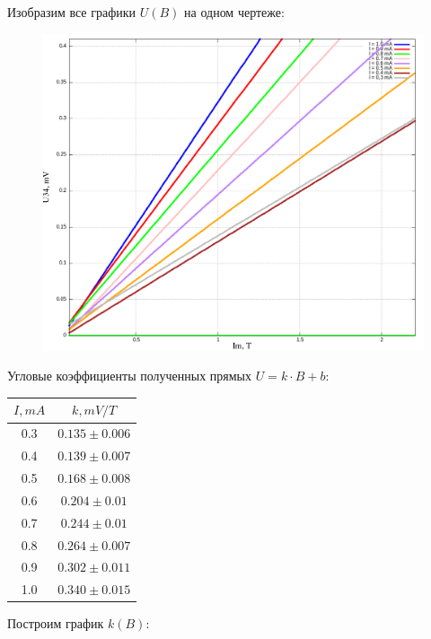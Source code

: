 \documentclass{article}
\begin{document}
Изобразим все графики \(U(B)\) на одном чертеже:

\begin{figure}[H]
    \centering
    \includegraphics[width=\textwidth]{multy-plot.png}
\end{figure}
    

Угловые коэффициенты полученных прямых \( U = k \cdot B + b \):

\begin{table}[H]
    \centering
    \begin{tabular}{|c|c|}
        \hline
        \( I, mA \) & \( k, mV/T \)\\\hline
        0.3 & \( 0.135 \pm 0.006 \) \\\hline
        0.4 & \( 0.139 \pm 0.007 \) \\\hline
        0.5 & \( 0.168 \pm 0.008 \) \\\hline
        0.6 & \( 0.204 \pm 0.01  \) \\\hline
        0.7 & \( 0.244 \pm 0.01  \) \\\hline
        0.8 & \( 0.264 \pm 0.007 \) \\\hline
        0.9 & \( 0.302 \pm 0.011 \) \\\hline
        1.0 & \( 0.340 \pm 0.015 \) \\\hline
    \end{tabular}
\end{table}

Построим график \( k(B) \):
\end{document}

